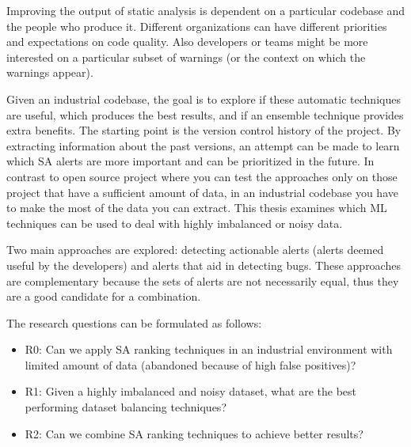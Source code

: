 \documentclass{article}
\begin{document}


Improving the output of static analysis is dependent on a particular codebase and the people who produce it. Different organizations can have different priorities and expectations on code quality. Also developers or teams might be more interested on a particular subset of warnings (or the context on which the warnings appear).

Given an industrial codebase, the goal is to explore if these automatic techniques are useful, which produces the best results, and if an ensemble technique provides extra benefits. The starting point is the version control history of the project. By extracting information about the past versions, an attempt can be made to learn which SA alerts are more important and can be prioritized in the future. In contrast to open source project where you can test the approaches only on those project that have a sufficient amount of data, in an industrial codebase you have to make the most of the data you can extract. This thesis examines which ML techniques can be used to deal with highly imbalanced or noisy data.

Two main approaches are explored: detecting actionable alerts (alerts deemed useful by the developers) and alerts that aid in detecting bugs. These approaches are complementary because the sets of alerts are not necessarily equal, thus they are a good candidate for a combination.

The research questions can be formulated as follows:
\begin{itemize}
    \item R0: Can we apply SA ranking techniques in an industrial environment with limited amount of data (abandoned because of high false positives)?
    \item R1: Given a highly imbalanced and noisy dataset, what are the best performing dataset balancing techniques?
    \item R2: Can we combine SA ranking techniques to achieve better results?
\end{itemize}
\end{document}
